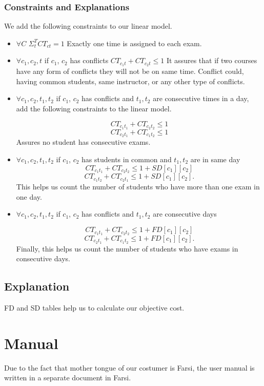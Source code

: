 \documentclass{report}
\begin{document}
\subsection{Constraints and Explanations}
We add the following constraints to our linear model.
\begin{itemize}
\item{$\forall C$ \space $\Sigma_t^T CT_{ct} = 1$ \newline 
Exactly one time is assigned to each exam.}

\item{$\forall c_1 , c_2 , t $ \space if $c_1$, $c_2$ has conflicts $CT_{c_1 t} + CT_{c_2 t} \le 1$
	\newline 
	It assures that if two courses have any form of conflicts they will not be on same time. Conflict could, having common students, same instructor, or any other type of conflicts.
	 }

\item{$\forall c_1 , c_2 , t_1 , t_2$ \space if $c_1$, $c_2$ has conflicts and $t_1, t_2$ are consecutive times in a day, add the following constraints to the linear model.
	
	\begin{equation*}
		CT_{c_1 t_1} + CT_{c_2 t_2} \le 1
	\end{equation*}
	\begin{equation*}
		CT_{c_2 t_1} + CT_{c_1 t_2} \le 1 
	\end{equation*}
	Assures no student has consecutive exams.
	}

\item{$\forall c_1 , c_2 , t_1, t_2 $ \space if $c_1$, $c_2$ has students in common and $t_1 ,t_2 $ are in same day 
	\begin{equation*}
		CT_{c_1 t_1} + CT_{c_2 t_2} \le 1 + SD[c_1][c_2]		
	\end{equation*}
	\begin{equation*}
		CT_{c_1 t_2} + CT_{c_2 t_1} \le 1 + SD[c_1][c_2].
	\end{equation*} 
	This helps us count the number of students who have more than one exam in one day.
}


\item{$\forall c_1 ,  c_2 ,  t_1 , t_2$ \space if $c_1$, $c_2$ has conflicts and $t_1 , t_2$ are consecutive days 
	
	\begin{equation*}
		CT_{c_1 t_1} + CT_{c_2 t_2} \le 1 + FD[c_1][c_2]
	\end{equation*}
	\begin{equation*}
		CT_{c_2 t_1} + CT_{c_1 t_2} \le 1 + FD[c_1][c_2].
	\end{equation*}
	Finally, this helps us count the number of students who have exams in consecutive days. 	
  }

\end{itemize}
\section{Explanation}
FD and SD tables help us to calculate our objective cost.
\chapter{Manual}
Due to the fact that mother tongue of our costumer is Farsi, the user manual is written in a separate document in Farsi.
\end{document}
